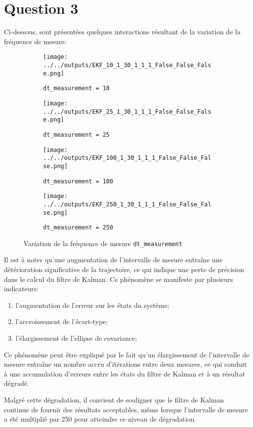 \documentclass[../CSC_5RO12_TA_TP2.tex]{subfiles}
\begin{document}
\section{Question 3}
\noindent Ci-dessous, sont présentées quelques interactions résultant de la variation de la fréquence de mesure:
\begin{figure}[H]
    \centering
    \begin{subfigure}[b]{0.475\textwidth}
        \centering
        \texttt{[image: ../../outputs/EKF\_10\_1\_30\_1\_1\_1\_False\_False\_False.png]}
        \caption{\texttt{dt\_measurement = 10}}
        \label{}
    \end{subfigure}\hfill
    \begin{subfigure}[b]{0.475\textwidth}
        \centering
        \texttt{[image: ../../outputs/EKF\_25\_1\_30\_1\_1\_1\_False\_False\_False.png]}
        \caption{\texttt{dt\_measurement = 25}}
        \label{}
    \end{subfigure}
    \begin{subfigure}[b]{0.475\textwidth}
        \centering
        \texttt{[image: ../../outputs/EKF\_100\_1\_30\_1\_1\_1\_False\_False\_False.png]}
        \caption{\texttt{dt\_measurement = 100}}
        \label{}
    \end{subfigure}\hfill
    \begin{subfigure}[b]{0.475\textwidth}
        \centering
        \texttt{[image: ../../outputs/EKF\_250\_1\_30\_1\_1\_1\_False\_False\_False.png]}
        \caption{\texttt{dt\_measurement = 250}}
        \label{}
    \end{subfigure}
    \caption{Variation de la fréquence de mesure \texttt{dt\_measurement}}
    \label{}
\end{figure}
\noindent Il est à noter qu'une augmentation de l'intervalle de mesure entraîne une détérioration significative de la trajectoire, ce qui indique une perte de précision dans le calcul du filtre de Kalman. Ce phénomène se manifeste par plusieurs indicateurs: 
\begin{enumerate}[noitemsep]
    \item l'augmentation de l'erreur sur les états du système;
    \item l'accroissement de l'écart-type;
    \item l'élargissement de l'ellipse de covariance;
\end{enumerate}
\noindent Ce phénomène peut être expliqué par le fait qu'un élargissement de l'intervalle de mesure entraîne un nombre accru d'itérations entre deux mesures, ce qui conduit à une accumulation d'erreurs entre les états du filtre de Kalman et à un résultat dégradé.
\begin{remark}
    Malgré cette dégradation, il convient de souligner que le filtre de Kalman continue de fournir des résultats acceptables, même lorsque l'intervalle de mesure a été multiplié par 250 pour atteindre ce niveau de dégradation.
\end{remark}
\end{document}
